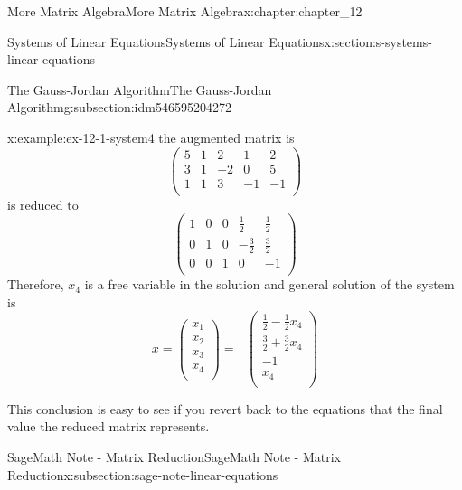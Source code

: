 \documentclass[oneside,10pt,]{book}
\numberwithin{equation}{section}
\begin{document}
\begin{chapterptx}{More Matrix Algebra}{}{More Matrix Algebra}{}{}{x:chapter:chapter_12}
\begin{sectionptx}{Systems of Linear Equations}{}{Systems of Linear Equations}{}{}{x:section:s-systems-linear-equations}
\begin{subsectionptx}{The Gauss-Jordan Algorithm}{}{The Gauss-Jordan Algorithm}{}{}{g:subsection:idm546595204272}
\begin{example}{}{x:example:ex-12-1-system4}
the augmented matrix is%
\begin{equation*}
\left(
\begin{array}{cccc|c}
5 & 1 & 2 & 1 & 2 \\
3 & 1 & -2 & 0 & 5 \\
1 & 1 & 3 & -1 & -1 \\
\end{array}
\right)
\end{equation*}
is reduced to%
\begin{equation*}
\left(
\begin{array}{cccc|c}
1 & 0 & 0 & \frac{1}{2} & \frac{1}{2} \\
0 & 1 & 0 & -\frac{3}{2} & \frac{3}{2} \\
0 & 0 & 1 & 0 & -1 \\
\end{array}
\right)
\end{equation*}
Therefore, \(x_4\) is a free variable in the solution and general solution of the system is%
\begin{equation*}
x =\left(
\begin{array}{c}
x_1 \\
x_2 \\
x_3 \\
x_4 \\
\end{array}
\right)=\text{  }\left(
\begin{array}{c}
\frac{1}{2}-\frac{1}{2}x_4 \\
\frac{3}{2}+\frac{3}{2}x_4 \\
-1 \\
x_4 \\
\end{array}
\right)
\end{equation*}
%
\par
This conclusion is easy to see if you revert back to the equations that the final value the reduced matrix represents.%
\end{example}
\end{subsectionptx}
%
%
\typeout{************************************************}
\typeout{************************************************}
%
\begin{subsectionptx}{SageMath Note - Matrix Reduction}{}{SageMath Note - Matrix Reduction}{}{}{x:subsection:sage-note-linear-equations}
%

\end{subsectionptx}
\end{sectionptx}
\end{chapterptx}
\end{document}
